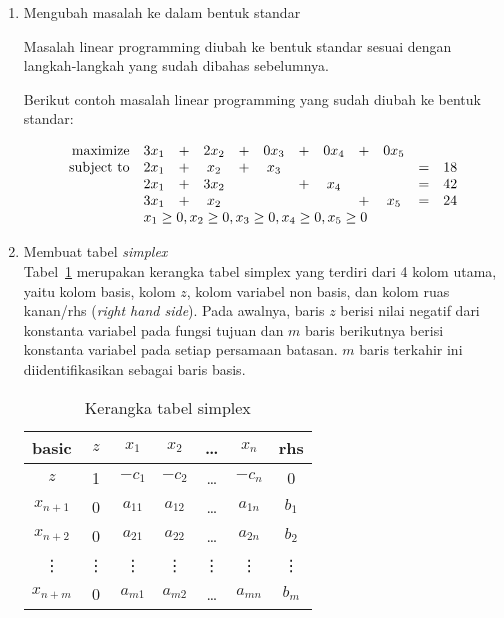 \begin{enumerate}
	\item Mengubah masalah ke dalam bentuk standar
	
        Masalah linear programming diubah ke bentuk standar sesuai dengan langkah-langkah yang sudah dibahas sebelumnya.
        
        Berikut contoh masalah linear programming yang sudah diubah ke bentuk standar:
        
	    \begin{equation*}
			\begin{array}{r c c c c c c c c c c l}
    	    	\text{maximize}   & 3x_1 & + & 2x_2 & + & 0x_3 & + & 0x_4 & + & 0x_5\\
	            \text{subject to} & 2x_1 & + & x_2  & + & x_3 &   &       &   &       & = & 18 \\
                        	   		& 2x_1 & + & 3x_2 &   &       & + & x_4 &   &       & = & 42 \\
                    	       		& 3x_1 & + & x_2  &   &       &   &       & + & x_5 & = & 24 \\
                	           		& \multicolumn{11}{l}{x_1\geq0,x_2\geq0,x_3\geq0,x_4\geq0,x_5\geq0} \\
        	\end{array}
		\end{equation*}
			
	\item Membuat tabel \textit{simplex}\\
		Tabel~\ref{tab:kerangka_tabel_simplex} merupakan kerangka tabel simplex yang terdiri dari 4 kolom utama, yaitu kolom basis, kolom $z$, kolom variabel non basis, dan kolom ruas kanan/rhs (\textit{right hand side}). Pada awalnya, baris $z$ berisi nilai negatif dari konstanta variabel pada fungsi tujuan dan $m$ baris berikutnya berisi konstanta variabel pada setiap persamaan batasan. $m$ baris terkahir ini diidentifikasikan sebagai baris basis.
        	
		\begin{table}[H]
			\centering
			\caption{Kerangka tabel simplex}
			\label{tab:kerangka_tabel_simplex}
			\begin{tabular}{|c|c|c c c c |c|}
				\hline
				basic & $z$ & $x_1$ & $x_2$ & \dots & $x_n$ & rhs \\
				\hline
				$z$ & 1 & $-c_1$ & $-c_2$ & \dots & $-c_n$ & 0 \\
				\hline
				$x_{n+1}$ & 0 & $a_{11}$ & $a_{12}$ & \dots & $a_{1n}$ & $b_1$ \\
				$x_{n+2}$ & 0 & $a_{21}$ & $a_{22}$ & \dots & $a_{2n}$ & $b_2$ \\
				\vdots & \vdots & \vdots & \vdots & \vdots & \vdots & \vdots \\
				$x_{n+m}$ & 0 & $a_{m1}$ & $a_{m2}$ & \dots & $a_{mn}$ & $b_m$ \\
				\hline
			\end{tabular}
		\end{table}
			

\end{enumerate}
